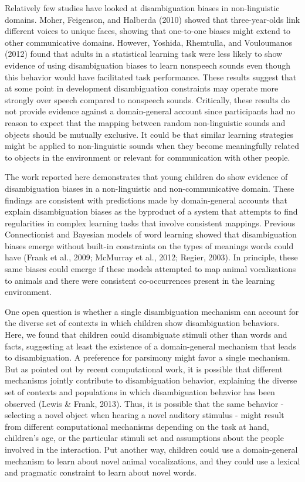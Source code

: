 \documentclass[english,floatsintext,man]{apa6}
\theoremstyle{definition}
\theoremstyle{definition}
\theoremstyle{definition}
\theoremstyle{remark}
\begin{document}
Relatively few studies have looked at disambiguation biases in
non-linguistic domains. Moher, Feigenson, and Halberda (2010) showed
that three-year-olds link different voices to unique faces, showing that
one-to-one biases might extend to other communicative domains. However,
Yoshida, Rhemtulla, and Vouloumanos (2012) found that adults in a
statistical learning task were less likely to show evidence of using
disambiguation biases to learn nonspeech sounds even though this
behavior would have facilitated task performance. These results suggest
that at some point in development disambiguation constraints may operate
more strongly over speech compared to nonspeech sounds. Critically,
these results do not provide evidence against a domain-general account
since participants had no reason to expect that the mapping between
random non-linguistic sounds and objects should be mutually exclusive.
It could be that similar learning strategies might be applied to
non-linguistic sounds when they become meaningfully related to objects
in the environment or relevant for communication with other people.

The work reported here demonstrates that young children do show evidence
of disambiguation biases in a non-linguistic and non-communicative
domain. These findings are consistent with predictions made by
domain-general accounts that explain disambiguation biases as the
byproduct of a system that attempts to find regularities in complex
learning tasks that involve consistent mappings. Previous Connectionist
and Bayesian models of word learning showed that disambiguation biases
emerge without built-in constraints on the types of meanings words could
have (Frank et al., 2009; McMurray et al., 2012; Regier, 2003). In
principle, these same biases could emerge if these models attempted to
map animal vocalizations to animals and there were consistent
co-occurrences present in the learning environment.

One open question is whether a single disambiguation mechanism can
account for the diverse set of contexts in which children show
disambiguation behaviors. Here, we found that children could
disambiguate stimuli other than words and facts, suggesting at least the
existence of a domain-general mechanism that leads to disambiguation. A
preference for parsimony might favor a single mechanism. But as pointed
out by recent computational work, it is possible that different
mechanisms jointly contribute to disambiguation behavior, explaining the
diverse set of contexts and populations in which disambiguation behavior
has been observed (Lewis \& Frank, 2013). Thus, it is possible that the
same behavior - selecting a novel object when hearing a novel auditory
stimulus - might result from different computational mechanisms
depending on the task at hand, children's age, or the particular stimuli
set and assumptions about the people involved in the interaction. Put
another way, children could use a domain-general mechanism to learn
about novel animal vocalizations, and they could use a lexical and
pragmatic constraint to learn about novel words.
\end{document}
